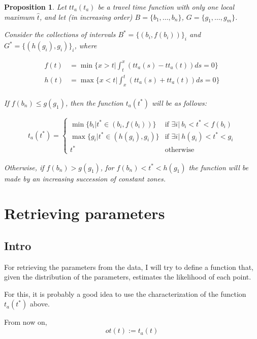 \documentclass{article}
\newtheorem{prop}{Proposition}
\begin{document}
\begin{prop}
  Let \(tt_a(t_a)\) be a travel time function with only one local maximum \(\hat{t}\),
  and let (in increasing order) \(B = \{b_1, \dots, b_n\}\), \(G = \{g_1, \dots, g_m\}\).


  Consider the collections of intervals \(B^* = \{(b_i, f(b_i))\}_i\) and \(G^* = \{(h(g_i), g_i)\}_i\), where
  
  \begin{align*}
    f(t) & = \min\{x>t | \int_t^x(tt_a(s) - tt_a(t)) ds = 0\} \\
    h(t) & = \max\{x<t | \int_x^t(tt_a(s) + tt_a(t)) ds = 0\} \\
  \end{align*}

  If \(f(b_n) \leq g(g_1)\), then the function \(t_a(t^*)\) will be as follows:

  \begin{align*}
    t_a(t^*) = 
    \begin{cases}
      \min \{b_i | t^* \in (b_i, f(b_i))\} & \text{if } \exists i |\ b_i < t^* < f(b_i) \\
      \max \{g_i | t^* \in (h(g_i), g_i)\} & \text{if } \exists i |\ h(g_i) < t^* < g_i \\
      t^* & \text{otherwise}
    \end{cases}
  \end{align*}

  Otherwise, if \(f(b_n) > g(g_1)\), for \(f(b_n) < t^* < h(g_1)\) the function will be made by an increasing succession of constant zones.
\end{prop}

\section{Retrieving parameters}

\subsection{Intro}

For retrieving the parameters from the data, I will try to define a function that,
given the distribution of the parameters, estimates the likelihood of each point.

For this, it is probably a good idea to use the characterization of the function \(t_a(t^*)\) above.

From now on,
\begin{equation*}
  ot(t) := t_a(t)
\end{equation*}
\end{document}
